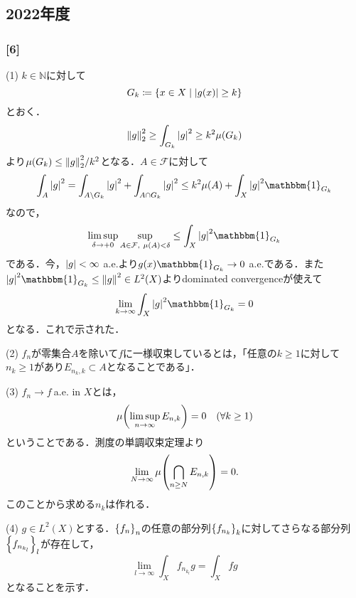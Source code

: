 \documentclass[a4j]{ltjsarticle}
\newcommand{\Nset}{\mathbb{N}}
\newcommand{\1}{\mathbbm{1}}
\numberwithin{equation}{section}
\theoremstyle{definition}
\begin{document}
\subsection{2022年度}
\subsubsection*{[6]}
(1) $k\in\Nset$に対して
\begin{equation}
    G_k\coloneq \qty{x\in X\mid \abs{g(x)}\geq k}
\end{equation}
とおく．
\begin{equation}
    \norm{g}_2^2\geq \int_{G_k}\abs{g}^2\geq k^2\mu(G_k)
\end{equation}
より$\mu(G_k)\leq \norm{g}_2^2/k^2$となる．$A\in \mathcal{F}$に対して
\begin{equation}
    \int_{A}\abs{g}^2=\int_{A\setminus G_k}\abs{g}^2+\int_{A\cap G_k}\abs{g}^2\leq k^2\mu(A)+\int_{X}\abs{g}^2\1_{G_k}
\end{equation}
なので，
\begin{equation}
    \limsup_{\delta\to+0}\sup_{A\in \mathcal{F},\ \mu(A)<\delta}\leq \int_{X}\abs{g}^2\1_{G_k}
\end{equation}
である．今，$\abs{g}<\infty$ a.e.より$g(x)\1_{G_k}\to 0$ a.e.である．また$\abs{g}^2\1_{G_k}\leq \norm{g}^2\in L^2(X)$よりdominated convergenceが使えて
\begin{equation}
    \lim_{k\to\infty}\int_{X}\abs{g}^2\1_{G_k}=0 
\end{equation}
となる．これで示された．

(2) $f_n$が零集合$A$を除いて$f$に一様収束しているとは，「任意の$k\geq 1$に対して$n_k\geq 1$があり$E_{n_k,k}\subset A$となることである」．

(3) $f_n\to f\ $a.e. in $X$とは，
\begin{equation}
    \mu\qty(\limsup_{n\to\infty}E_{n,k})=0\quad (\forall k\geq 1)
\end{equation}
ということである．測度の単調収束定理より
\begin{equation}
    \lim_{N\to\infty}\mu\qty(\bigcap_{n\geq N}E_{n,k})=0.
\end{equation}
このことから求める$n_k$は作れる．

(4) $g\in L^2(X)$とする．$\qty{f_n}_n$の任意の部分列$\qty{f_{n_k}}_k$に対してさらなる部分列$\qty{f_{n_{k_l}}}_l$が存在して，
\begin{equation}
    \lim_{l\to\infty}\int_{X}f_{n_{k_l}}g=\int_{X}fg 
\end{equation}
となることを示す．
\end{document}
